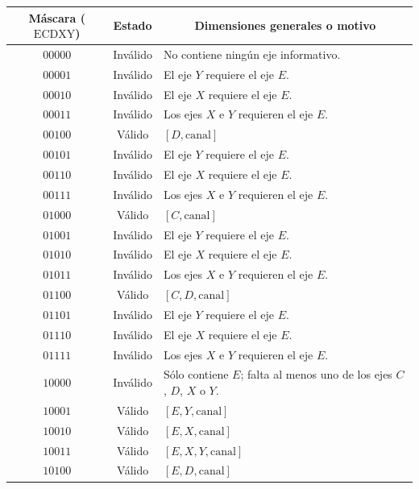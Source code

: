 \documentclass[11pt,a4paper,spanish]{book}
\numberwithin{equation}{chapter}
\numberwithin{figure}{chapter}
\begin{document}
\begin{table}[h]
\centering
\scriptsize
\setlength{\tabcolsep}{4pt}
\renewcommand{\arraystretch}{0.9}
\begin{tabular}{|c|c|p{9.2cm}|}
	\hline
	Máscara (\(\mathrm{ECDXY}\)) & Estado & \multicolumn{1}{c|}{Dimensiones generales o motivo} \\
	\hline
	\(00000\) & Inválido & No contiene ningún eje informativo. \\
	\hline
	\(00001\) & Inválido & El eje $Y$ requiere el eje $E$. \\
	\hline
	\(00010\) & Inválido & El eje $X$ requiere el eje $E$. \\
	\hline
	\(00011\) & Inválido & Los ejes $X$ e $Y$ requieren el eje $E$. \\
	\hline
	\(00100\) & Válido & $[D,\mathrm{canal}]$ \\
	\hline
	\(00101\) & Inválido & El eje $Y$ requiere el eje $E$. \\
	\hline
	\(00110\) & Inválido & El eje $X$ requiere el eje $E$. \\
	\hline
	\(00111\) & Inválido & Los ejes $X$ e $Y$ requieren el eje $E$. \\
	\hline
	\(01000\) & Válido & $[C,\mathrm{canal}]$ \\
	\hline
	\(01001\) & Inválido & El eje $Y$ requiere el eje $E$. \\
	\hline
	\(01010\) & Inválido & El eje $X$ requiere el eje $E$. \\
	\hline
	\(01011\) & Inválido & Los ejes $X$ e $Y$ requieren el eje $E$. \\
	\hline
	\(01100\) & Válido & $[C,D,\mathrm{canal}]$ \\
	\hline
	\(01101\) & Inválido & El eje $Y$ requiere el eje $E$. \\
	\hline
	\(01110\) & Inválido & El eje $X$ requiere el eje $E$. \\
	\hline
	\(01111\) & Inválido & Los ejes $X$ e $Y$ requieren el eje $E$. \\
	\hline
	\(10000\) & Inválido & Sólo contiene $E$; falta al menos uno de los ejes $C$, $D$, $X$ o $Y$. \\
	\hline
	\(10001\) & Válido & $[E,Y,\mathrm{canal}]$ \\
	\hline
	\(10010\) & Válido & $[E,X,\mathrm{canal}]$ \\
	\hline
	\(10011\) & Válido & $[E,X,Y,\mathrm{canal}]$ \\
	\hline
	\(10100\) & Válido & $[E,D,\mathrm{canal}]$ \\

\end{tabular}
\end{table}
\end{document}
